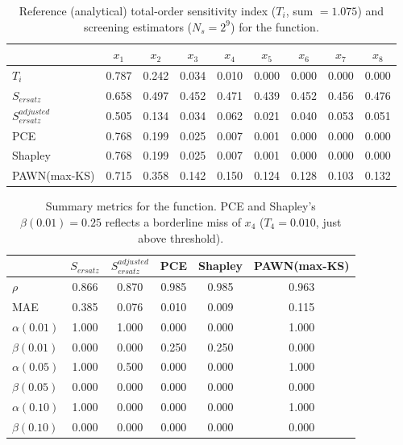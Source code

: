 \documentclass[12pt]{article}
\begin{document}
\begin{table}[H]
\centering
\begin{tabular}{@{}lcccccccc@{}} \toprule
 & $x_1$ & $x_2$ & $x_3$ & $x_4$ & $x_5$ & $x_6$ & $x_7$ & $x_8$ \\ \midrule
$T_i$                   & 0.787 & 0.242 & 0.034 & 0.010 & 0.000 & 0.000 & 0.000 & 0.000 \\
$S_{ersatz}$            & 0.658 & 0.497 & 0.452 & 0.471 & 0.439 & 0.452 & 0.456 & 0.476 \\
$S^{adjusted}_{ersatz}$ & 0.505 & 0.134 & 0.034 & 0.062 & 0.021 & 0.040 & 0.053 & 0.051 \\
PCE                     & 0.768 & 0.199 & 0.025 & 0.007 & 0.001 & 0.000 & 0.000 & 0.000 \\
Shapley                 & 0.768 & 0.199 & 0.025 & 0.007 & 0.001 & 0.000 & 0.000 & 0.000 \\
PAWN(max-KS)            & 0.715 & 0.358 & 0.142 & 0.150 & 0.124 & 0.128 & 0.103 & 0.132 \\ \bottomrule
\end{tabular}
\caption{Reference (analytical) total-order sensitivity index ($T_i$, sum $=1.075$) and screening estimators ($N_s=2^9$) for the \cite{sobol1998quasi} function.}
\label{tab:sobol_function}
\end{table}

\begin{table}[H]
\centering
\begin{tabular}{@{}l|ccccc@{}} \toprule
 & $S_{ersatz}$ & $S^{adjusted}_{ersatz}$ & PCE & Shapley & PAWN(max-KS) \\ \midrule
$\rho$           & 0.866 & 0.870 & 0.985 & 0.985 & 0.963 \\
MAE              & 0.385 & 0.076 & 0.010 & 0.009 & 0.115 \\
$\alpha(0.01)$   & 1.000 & 1.000 & 0.000 & 0.000 & 1.000 \\
$\beta(0.01)$    & 0.000 & 0.000 & 0.250 & 0.250 & 0.000 \\
$\alpha(0.05)$   & 1.000 & 0.500 & 0.000 & 0.000 & 1.000 \\
$\beta(0.05)$    & 0.000 & 0.000 & 0.000 & 0.000 & 0.000 \\
$\alpha(0.10)$   & 1.000 & 0.000 & 0.000 & 0.000 & 1.000 \\
$\beta(0.10)$    & 0.000 & 0.000 & 0.000 & 0.000 & 0.000 \\ \bottomrule
\end{tabular}
\caption{Summary metrics for the \cite{sobol1998quasi} function. PCE and Shapley's $\beta(0.01)=0.25$ reflects a borderline miss of $x_4$ ($T_4=0.010$, just above threshold).}
\label{tab:sobol_summary}
\end{table}
\end{document}
